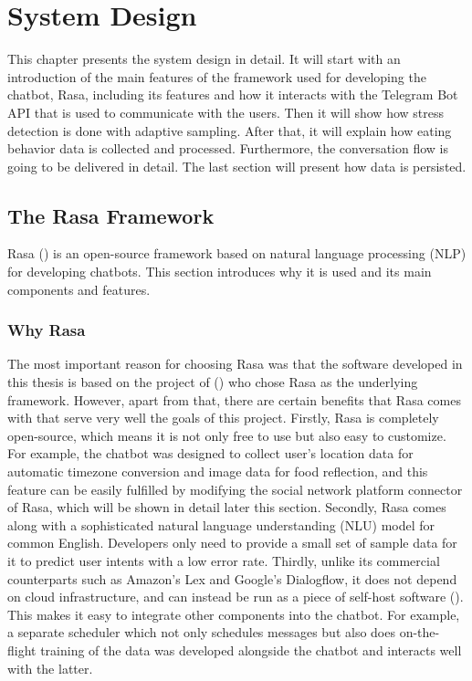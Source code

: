 
\chapter{System Design}\label{chapter:sys_design}
This chapter presents the system design in detail. It will start with an introduction of the main features of the framework used for developing the chatbot, Rasa, including its features and how it interacts with the Telegram Bot API that is used to communicate with the users. Then it will show how stress detection is done with adaptive sampling. After that, it will explain how eating behavior data is collected and processed. Furthermore, the conversation flow is going to be delivered in detail. The last section will present how data is persisted.

\section{The Rasa Framework}
Rasa (\citeyear{10_rasa}) is an open-source framework based on natural language processing (NLP) for developing chatbots. This section introduces why it is used and its main components and features.

\subsection{Why Rasa}
The most important reason for choosing Rasa was that the software developed in this thesis is based on the project of \citeauthor{17_ludwig} (\citeyear{17_ludwig}) who chose Rasa as the underlying framework. However, apart from that, there are certain benefits that Rasa comes with that serve very well the goals of this project. Firstly, Rasa is completely open-source, which means it is not only free to use but also easy to customize. For example, the chatbot was designed to collect user's location data for automatic timezone conversion and image data for food reflection, and this feature can be easily fulfilled by modifying the social network platform connector of Rasa, which will be shown in detail later this section. Secondly, Rasa comes along with a sophisticated natural language understanding (NLU) model for common English. Developers only need to provide a small set of sample data for it to predict user intents with a low error rate. Thirdly, unlike its commercial counterparts such as Amazon’s Lex and Google's Dialogflow, it does not depend on cloud infrastructure, and can instead be run as a piece of self-host software (\cite{24_why_rasa}). This makes it easy to integrate other components into the chatbot. For example, a separate scheduler which not only schedules messages but also does on-the-flight training of the data was developed alongside the chatbot and interacts well with the latter.

